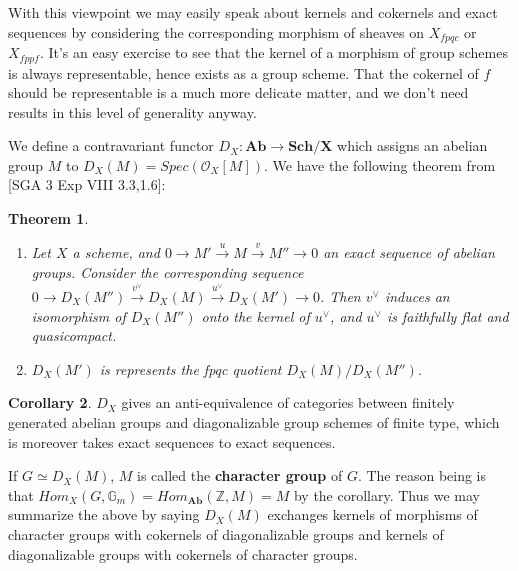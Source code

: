 \documentclass{ucbthesis}
\newtheorem{thm}{Theorem}[section]
\theoremstyle{definition}
\theoremstyle{theorem}
\newtheorem{cor}[thm]{Corollary}
\begin{document}
With this viewpoint we may easily speak about kernels and cokernels and exact sequences by considering the corresponding morphism of sheaves on $X_{fpqc}$ or $X_{fppf}$. It's an easy exercise to see that the kernel of a morphism of group schemes is always representable, hence exists as a group scheme. That the cokernel of $f$ should be representable is a much more delicate matter, and we don't need results in this level of generality anyway.

We define a contravariant functor $D_{X}:\mathbf{Ab} \rightarrow \mathbf{Sch/X}$ which assigns an abelian group $M$ to $D_{X}(M) = Spec(\mathcal{O}_{X}[M])$. We have the following theorem from [SGA 3 Exp VIII 3.3,1.6]:

\begin{thm}
\begin{enumerate}
\item Let $X$ a scheme, and $0\rightarrow M' \xrightarrow{u} M \xrightarrow{v} M'' \rightarrow 0$ an exact sequence of abelian groups. Consider the corresponding sequence $0\rightarrow D_{X}(M'') \xrightarrow{v^{\vee}} D_{X}(M) \xrightarrow{u^{\vee}} D_{X}(M') \rightarrow 0$. Then $v^{\vee}$ induces an isomorphism of $D_{X}(M'')$ onto the kernel of $u^{\vee}$, and $u^{\vee}$ is faithfully flat and quasicompact. 
\item $D_{X}(M')$ is represents the fpqc quotient $ D_{X}(M)/D_{X}(M'')$. 
\end{enumerate}
\end{thm}

\begin{cor}
$D_{X}$ gives an anti-equivalence of categories between finitely generated abelian groups and diagonalizable group schemes of finite type, which is moreover takes exact sequences to exact sequences. 
\end{cor}

If $G \simeq D_{X}(M)$, $M$ is called the \textbf{character group} of $G$. The reason being is that $Hom_{X}(G,\mathbb{G}_{m}) = Hom_{\mathbf{Ab}}(\mathbb{Z},M) = M$ by the corollary. Thus we may summarize the above by saying $D_{X}(M)$ exchanges kernels of morphisms of character groups with cokernels of diagonalizable groups and kernels of diagonalizable groups with cokernels of character groups.
\end{document}
